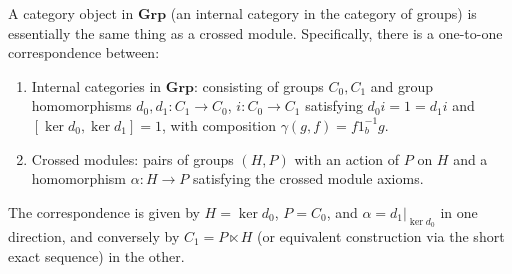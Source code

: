A category object in $\mathbf{Grp}$ (an internal category in the category of groups) is essentially the same thing as a crossed module. Specifically, there is a one-to-one correspondence between:

\begin{enumerate}
\item Internal categories in $\mathbf{Grp}$: consisting of groups $C_0, C_1$ and group homomorphisms $d_0, d_1 : C_1 \rightarrow C_0$, $i : C_0 \rightarrow C_1$ satisfying $d_0 i = 1 = d_1 i$ and $[\ker d_0, \ker d_1] = 1$, with composition $\gamma(g, f) = f 1_b^{-1} g$.
\item Crossed modules: pairs of groups $(H, P)$ with an action of $P$ on $H$ and a homomorphism $\alpha : H \rightarrow P$ satisfying the crossed module axioms.
\end{enumerate}

The correspondence is given by $H = \ker d_0$, $P = C_0$, and $\alpha = d_1|_{\ker d_0}$ in one direction, and conversely by $C_1 = P \ltimes H$ (or equivalent construction via the short exact sequence) in the other.
